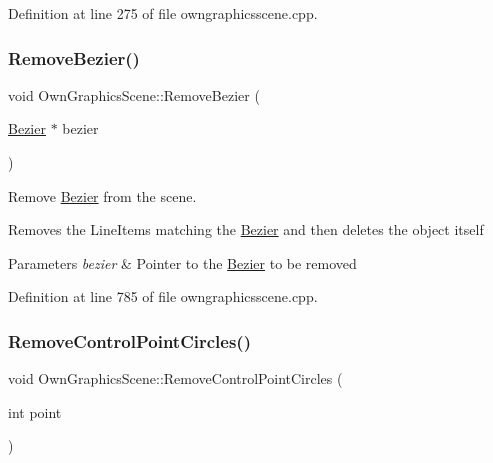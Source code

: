 Definition at line 275 of file owngraphicsscene.\+cpp.

\mbox{\label{classOwnGraphicsScene_a24d8270608b0bd56c6155d99d7722ab8}} 
\subsubsection{\texorpdfstring{Remove\+Bezier()}{RemoveBezier()}}
{\footnotesize\ttfamily void Own\+Graphics\+Scene\+::\+Remove\+Bezier (\begin{DoxyParamCaption}\item[{\mbox{\hyperlink{classBezier}{Bezier}} $\ast$}]{bezier }\end{DoxyParamCaption})}



Remove \mbox{\hyperlink{classBezier}{Bezier}} from the scene. 

Removes the Line\+Items matching the \mbox{\hyperlink{classBezier}{Bezier}} and then deletes the object itself 
\begin{DoxyParams}{Parameters}
{\em bezier} & Pointer to the \mbox{\hyperlink{classBezier}{Bezier}} to be removed \\
\hline
\end{DoxyParams}


Definition at line 785 of file owngraphicsscene.\+cpp.

\mbox{\label{classOwnGraphicsScene_ad6ad8eaab22c10b1a228f08d8bd5bb68}} 
\subsubsection{\texorpdfstring{Remove\+Control\+Point\+Circles()}{RemoveControlPointCircles()}}
{\footnotesize\ttfamily void Own\+Graphics\+Scene\+::\+Remove\+Control\+Point\+Circles (\begin{DoxyParamCaption}\item[{int}]{point }\end{DoxyParamCaption})}



